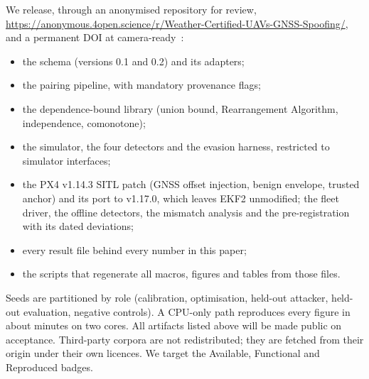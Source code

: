 We release, through an anonymised repository for review,
\url{https://anonymous.4open.science/r/Weather-Certified-UAVs-GNSS-Spoofing/}, and a
permanent DOI at camera-ready~\cite{artifact}:
\begin{itemize}
\item the schema (versions 0.1 and 0.2) and its adapters;
\item the pairing pipeline, with mandatory provenance flags;
\item the dependence-bound library (union bound, Rearrangement Algorithm,
  independence, comonotone);
\item the simulator, the four detectors and the evasion harness, restricted to
  simulator interfaces;
\item the PX4 v1.14.3 SITL patch (GNSS offset injection, benign envelope, trusted
  anchor) and its port to v1.17.0, which leaves EKF2 unmodified; the fleet driver,
  the offline detectors, the mismatch analysis and the pre-registration with its
  dated deviations;
\item every result file behind every number in this paper;
\item the scripts that regenerate all macros, figures and tables from those
  files.
\end{itemize}

Seeds are partitioned by role (calibration, optimisation, held-out attacker,
held-out evaluation, negative controls). A CPU-only path reproduces every
figure in about \nWallMin{} minutes on two cores. All artifacts listed above will be made
public on acceptance. Third-party corpora are not redistributed; they are
fetched from their origin under their own licences. We target the Available, Functional and
Reproduced badges.

